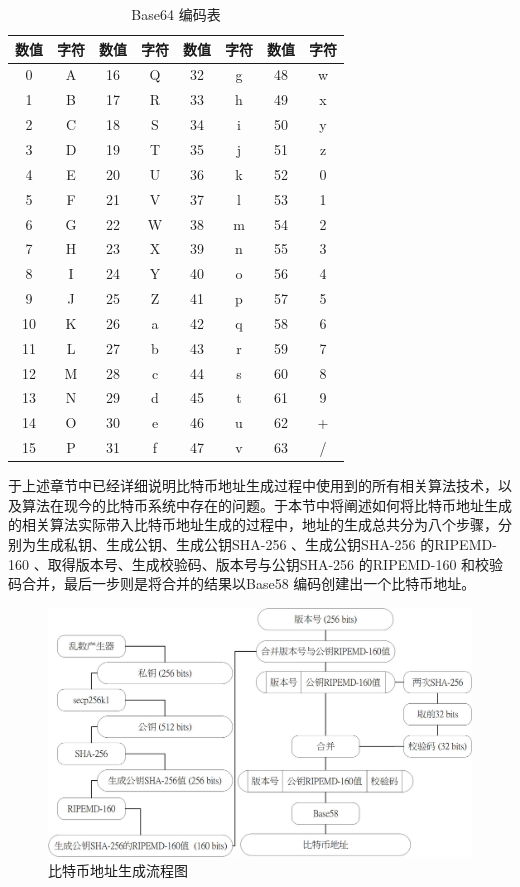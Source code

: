 					\begin{table}[!htbp]
					\centering
					\caption{Base64 编码表}
					\label{Base64}
					\begin{tabular}{|c|c|c|c|c|c|c|c|}
					\hline
					数值 & 字符 & 数值 & 字符 & 数值 & 字符 & 数值 & 字符 \\ \hline
					0 & A & 16 & Q & 32 & g & 48 & w \\ \hline
					1 & B & 17 & R & 33 & h & 49 & x \\ \hline
					2 & C & 18 & S & 34 & i & 50 & y \\ \hline
					3 & D & 19 & T & 35 & j & 51 & z \\ \hline
					4 & E & 20 & U & 36 & k & 52 & 0 \\ \hline
					5 & F & 21 & V & 37 & l & 53 & 1 \\ \hline
					6 & G & 22 & W & 38 & m & 54 & 2 \\ \hline
					7 & H & 23 & X & 39 & n & 55 & 3 \\ \hline
					8 & I & 24 & Y & 40 & o & 56 & 4 \\ \hline
					9 & J & 25 & Z & 41 & p & 57 & 5 \\ \hline
					10 & K & 26 & a & 42 & q & 58 & 6 \\ \hline
					11 & L & 27 & b & 43 & r & 59 & 7 \\ \hline
					12 & M & 28 & c & 44 & s & 60 & 8 \\ \hline
					13 & N & 29 & d & 45 & t & 61 & 9 \\ \hline
					14 & O & 30 & e & 46 & u & 62 & + \\ \hline
					15 & P & 31 & f & 47 & v & 63 & / \\ \hline
					\end{tabular}
					\end{table}
			于上述章节中已经详细说明⽐特币地址⽣成过程中使⽤到的所有相关算法技术，以及算法在现今的⽐特币系统中存在的问题。于本节中将阐述如何将比特币地址生成的相关算法实际带入比特币地址生成的过程中，地址的生成总共分为八个步骤，分别为生成私钥、生成公钥、生成公钥SHA-256 、生成公钥SHA-256 的RIPEMD-160 、取得版本号、生成校验码、版本号与公钥SHA-256 的RIPEMD-160 和校验码合并，最后一步则是将合并的结果以Base58 编码创建出一个比特币地址。

			\begin{figure}[!htbp]
					\centering
					\includegraphics[width = .9\textwidth]{address.jpg}
					\caption{比特币地址生成流程图}\label{address}
			\end{figure}

